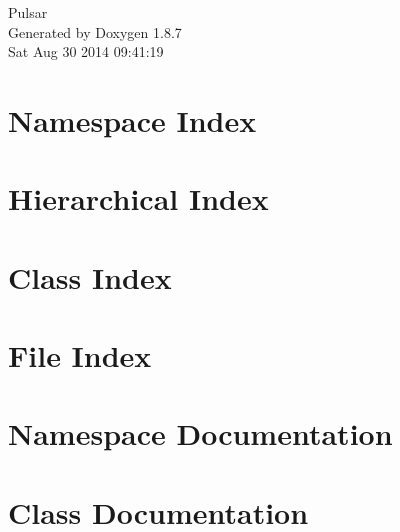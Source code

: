 \documentclass[twoside]{book}
\newcommand{\+}{\discretionary{\mbox{\scriptsize$\hookleftarrow$}}{}{}}
\newcommand{\clearemptydoublepage}{%
  \newpage{\pagestyle{empty}\cleardoublepage}%
}
\begin{document}
\hypersetup{pageanchor=false,
             bookmarks=true,
             bookmarksnumbered=true,
             pdfencoding=unicode
            }
\begin{titlepage}
\vspace*{7cm}
\begin{center}%
{\Large Pulsar }\\
\vspace*{1cm}
{\large Generated by Doxygen 1.8.7}\\
\vspace*{0.5cm}
{\small Sat Aug 30 2014 09:41:19}\\
\end{center}
\end{titlepage}
\clearemptydoublepage
\tableofcontents
\clearemptydoublepage
{}
\hypersetup{pageanchor=true}

\chapter{Namespace Index}

\chapter{Hierarchical Index}

\chapter{Class Index}

\chapter{File Index}

\chapter{Namespace Documentation}

\chapter{Class Documentation}



















\end{document}
